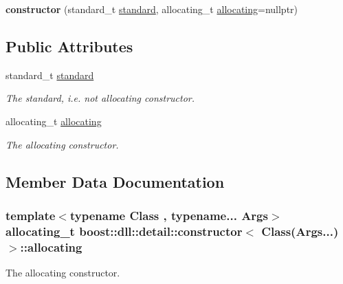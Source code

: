 \begin{DoxyCompactItemize}
\item 
{\bfseries constructor} (standard\+\_\+t \hyperlink{a00064_a6cbccda8c81959e8e3bba7da28cada5d}{standard}, allocating\+\_\+t \hyperlink{a00064_a13c90a276dc453ca83da117ffc552362}{allocating}=nullptr)\hypertarget{a00064_a403d27f9f509c0ce4e66d4713ca2affc}{}\label{a00064_a403d27f9f509c0ce4e66d4713ca2affc}

\end{DoxyCompactItemize}
\subsection*{Public Attributes}
\begin{DoxyCompactItemize}
\item 
standard\+\_\+t \hyperlink{a00064_a6cbccda8c81959e8e3bba7da28cada5d}{standard}
\begin{DoxyCompactList}\small\item\em The standard, i.\+e. not allocating constructor. \end{DoxyCompactList}\item 
allocating\+\_\+t \hyperlink{a00064_a13c90a276dc453ca83da117ffc552362}{allocating}
\begin{DoxyCompactList}\small\item\em The allocating constructor. \end{DoxyCompactList}\end{DoxyCompactItemize}


\subsection{Member Data Documentation}
\subsubsection[{\texorpdfstring{allocating}{allocating}}]{\setlength{\rightskip}{0pt plus 5cm}template$<$typename Class , typename... Args$>$ allocating\+\_\+t {\bf boost\+::dll\+::detail\+::constructor}$<$ Class(Args...)$>$\+::allocating}\hypertarget{a00064_a13c90a276dc453ca83da117ffc552362}{}\label{a00064_a13c90a276dc453ca83da117ffc552362}


The allocating constructor. 


